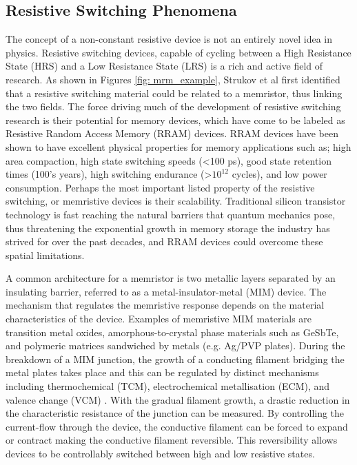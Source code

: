 \subsection{Resistive Switching Phenomena}
The concept of a non-constant resistive device is not an entirely novel idea in physics. Resistive switching devices, capable of cycling between a High Resistance State (HRS) and a Low Resistance State (LRS) is a rich and active field of research. As shown in Figures \ref{fig: mrm_example}, Strukov et al first identified that a resistive switching material could be related to a memristor\cite{strukov2008}, thus linking the two fields. The force driving much of the development of resistive switching research is their potential for memory devices, which have come to be labeled as Resistive Random Access Memory (RRAM) devices\cite{pan2014}. RRAM devices have been shown to have excellent physical properties for memory applications\cite{yang2013,valov2013} such as; high area compaction\cite{lim2015,wang2015}, high state switching speeds (<100 ps)\cite{choi2013}, good state retention times (100's years)\cite{chien2011,wang2012}, high switching endurance (>$10^{12}$ cycles)\cite{lee2011}, and low power consumption\cite{yang2013,valov2013,waser2007}. Perhaps the most important listed property of the resistive switching, or memristive devices is their scalability. Traditional silicon transistor technology is fast reaching the natural barriers that quantum mechanics pose\cite{thompson2006}, thus threatening the exponential growth in memory storage the industry has strived for over the past decades, and RRAM devices could overcome these spatial limitations. 

A common architecture for a memristor is two metallic layers separated by an insulating barrier, referred to as a metal-insulator-metal (MIM) device. The mechanism that regulates the memristive response depends on the material characteristics of the device. Examples of memristive MIM materials\cite{yang2013} are transition metal oxides\cite{strukov2008,gale2014}, amorphous-to-crystal phase materials such as GeSbTe\cite{wuttig2007}, and polymeric matrices sandwiched by metals (e.g. Ag/PVP plates)\cite{yang2012,scaling2018}. During the breakdown of a MIM junction, the growth of a conducting filament bridging the metal plates takes place and this can be regulated by distinct mechanisms including thermochemical (TCM), electrochemical metallisation (ECM), and valence change (VCM) \cite{memristors2014,lim2015,jeong2012,manning2017,waser2009}. With the gradual filament growth, a drastic reduction in the characteristic resistance of the junction can be measured. By controlling the current-flow through the device, the conductive filament can be forced to expand or contract making the conductive filament reversible\cite{yang2012}. This reversibility allows devices to be controllably switched between high and low resistive states\cite{yang2012}.


